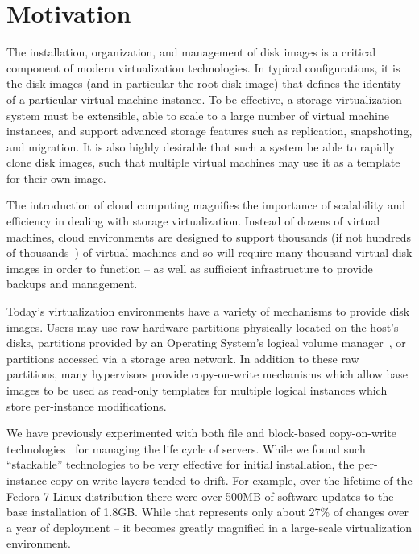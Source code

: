 \section{Motivation}

The installation, organization, and management of disk images is a critical
component of modern virtualization technologies. 
In typical configurations, it is the disk images (and in particular the root
disk image) that defines the identity of a particular virtual machine
instance.
To be effective, a storage virtualization system must be extensible,
able to scale to a large number of virtual machine instances, and support
advanced storage features such as replication, snapshoting, and migration.
It is also highly desirable that such a system be able to rapidly clone
disk images, such that multiple virtual machines may use it as a template
for their own image.

The introduction of cloud computing magnifies the importance
of scalability and efficiency in dealing with storage virtualization.
Instead of dozens of virtual machines, cloud environments are designed
to support thousands (if not hundreds of thousands~\cite{kittyhawk}) of 
virtual machines and so will require many-thousand virtual disk images
in order to function -- as well as sufficient infrastructure to provide
backups and management.

Today's virtualization environments have a variety of mechanisms to 
provide disk images.
Users may use raw hardware partitions physically located on the host's
disks, partitions provided by an Operating System's logical volume 
manager~\cite{lvm}, or partitions accessed via a storage area network.
In addition to these raw partitions, many hypervisors provide copy-on-write
mechanisms which allow base images to be used as read-only templates for 
multiple logical instances which store per-instance modifications.

We have previously experimented with both file and block-based copy-on-write
technologies~\cite{blutopia} for managing the life cycle of servers.
While we found such ``stackable'' technologies to be very effective for
initial installation, the per-instance copy-on-write layers tended to drift.
For example, over the lifetime of the Fedora 7 Linux distribution there 
were over 500MB of software updates to the base installation of 1.8GB.  
While that
represents only about 27\% of changes over a year of deployment -- it becomes
greatly magnified in a large-scale virtualization environment.  

